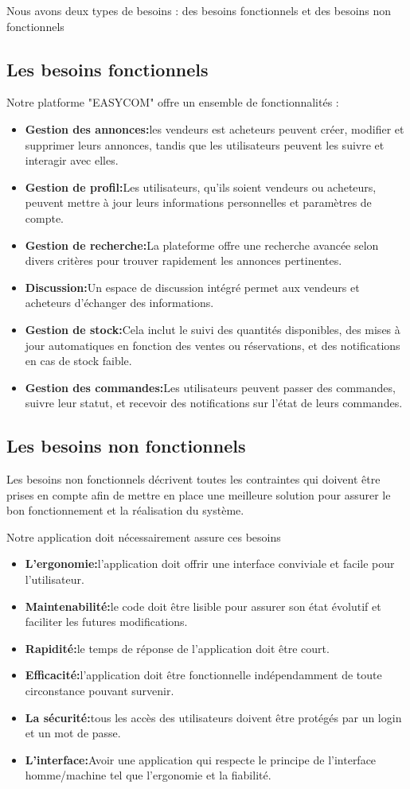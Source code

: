 \documentclass[edit,12pt,a4paper,ChapStyle,oneside,doubleinterligne]{report}
\begin{document}
Nous avons deux types de besoins : des besoins fonctionnels et des besoins non fonctionnels
\subsection{Les besoins fonctionnels }
Notre platforme "EASYCOM" offre un ensemble de fonctionnalités :
\begin{itemize}
    \item \textbf{Gestion des annonces:}les vendeurs est acheteurs peuvent créer, modifier et supprimer leurs annonces, tandis que les utilisateurs peuvent les suivre et interagir avec elles.
    \item \textbf{Gestion de profil:}Les utilisateurs, qu'ils soient vendeurs ou acheteurs, peuvent mettre à jour leurs informations personnelles et paramètres de compte.
    \item \textbf{Gestion de recherche:}La plateforme offre une recherche avancée selon divers critères pour trouver rapidement les annonces pertinentes.
    \item \textbf{Discussion:}Un espace de discussion intégré permet aux vendeurs et acheteurs d'échanger des informations.
    \item \textbf{Gestion de stock:}Cela inclut le suivi des quantités disponibles, des mises à jour automatiques en fonction des ventes ou réservations, et des notifications en cas de stock faible. 
    \item \textbf{Gestion des commandes:}Les utilisateurs peuvent passer des commandes, suivre leur statut, et recevoir des notifications sur l'état de leurs commandes.
\end{itemize}
\subsection{Les besoins non fonctionnels}
Les besoins non fonctionnels décrivent toutes les contraintes qui doivent être prises en compte afin de mettre en place une meilleure solution pour assurer le bon fonctionnement et la réalisation du système.

Notre application doit nécessairement assure ces besoins
\begin{itemize}
    \item \textbf{L’ergonomie:}l’application doit offrir une interface conviviale et facile pour l’utilisateur.
    \item \textbf{Maintenabilité:}le code doit être lisible pour assurer son état évolutif et faciliter les futures modifications.
    \item \textbf{Rapidité:}le temps de réponse de l’application doit être court.
    \item \textbf{Efficacité:}l’application doit être fonctionnelle indépendamment de toute circonstance pouvant survenir.
    \item \textbf{La sécurité:}tous les accès des utilisateurs doivent être protégés par un login et un mot de passe.
    \item \textbf{L’interface:}Avoir une application qui respecte le principe de l'interface homme/machine tel que l'ergonomie et la fiabilité.
\end{itemize}
\end{document}
